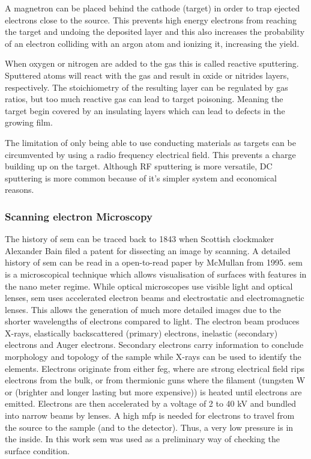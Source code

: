 A magnetron can be placed behind the cathode (target) in order to trap ejected electrons close to the source. 
This prevents high energy electrons from reaching the target and undoing the deposited layer and this also increases the probability of an electron colliding with an argon atom and ionizing it, increasing the yield.

When oxygen or nitrogen are added to the  gas this is called reactive sputtering.
Sputtered atoms will react with the gas and result in oxide or nitrides layers, respectively.
The stoichiometry of the resulting layer can be regulated by gas ratios, but too much reactive gas can lead to target poisoning. 
Meaning the target begin covered by an insulating layers which can lead to defects in the growing film\cite{Kelly2000}. 

The limitation of only being able to use conducting materials as targets can be circumvented by using a radio frequency electrical field. 
This prevents a charge building up on the target. %
Although RF sputtering is more versatile, DC sputtering is more common because of it's simpler system and economical reasons.

\subsubsection{Scanning electron Microscopy}
The history of \gls{sem} can be traced back to 1843 when Scottish clockmaker Alexander Bain filed a patent for dissecting an image by scanning. A detailed history of \gls{sem} can be read in a open-to-read paper by McMullan from 1995\cite{McMullan1995}. 
\Gls{sem} is a microscopical technique which allows visualisation of surfaces with features in the nano meter regime. 
While optical microscopes use visible light and optical lenses, \gls{sem} uses accelerated electron beams and electrostatic and electromagnetic lenses.
This allows the generation of much more detailed images due to the shorter wavelengths of electrons compared to light\cite{Kaliva2020}.
The electron beam produces X-rays, elastically backscattered (primary) electrons, inelastic (secondary) electrons and Auger electrons. 
Secondary electrons carry information to conclude morphology and topology of the sample while X-rays can be used to identify the elements. 
Electrons originate from either \gls{feg}, where are strong electrical field rips electrons from the bulk, or from thermionic guns where the filament (tungsten W or  (brighter and longer lasting but more expensive)) is heated until electrons are emitted. 
Electrons are then accelerated by a voltage of 2 to 40 kV and bundled into narrow beams\cite{Vernon2000} by lenses.
A high \gls{mfp} is needed for electrons to travel from the source to the sample (and to the detector). 
Thus, a very low pressure is in the inside. 
In this work \gls{sem} was used as a preliminary way of checking the surface condition. 



